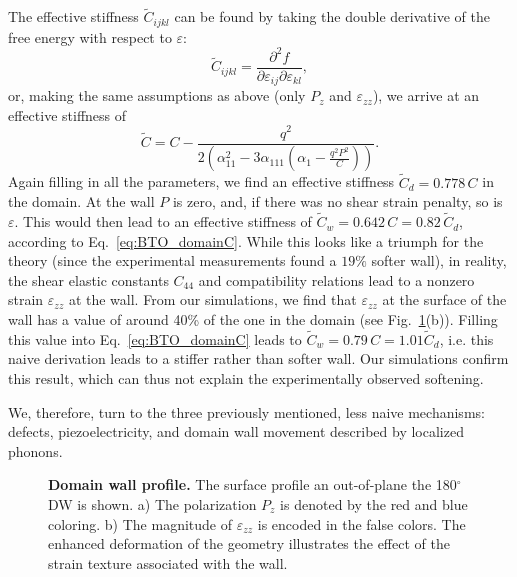 The effective stiffness $\tilde{C}_{ijkl}$ can be found by taking the double derivative of the free energy with respect to $\varepsilon$:
\begin{equation}
	\tilde{C}_{ijkl} = \frac{\partial^2 f}{\partial \varepsilon_{ij} \partial \varepsilon_{kl}},
\end{equation}
or, making the same assumptions as above (only $P_z$ and $\varepsilon_{zz}$), we arrive at an effective stiffness of
\begin{equation}
	\label{eq:BTO_domainC}
	\tilde{C} = C - \frac{q^2}{2\left(\alpha_{11}^2 - 3 \alpha_{111}\left(\alpha_1  - \frac{q^2 P^2}{C}\right)\right)}.
\end{equation}
Again filling in all the parameters, we find an effective stiffness $\tilde{C}_d = 0.778 \,C$ in the domain.
At the wall $P$ is zero, and, if there was no shear strain penalty, so is $\varepsilon$. This would then lead to an effective stiffness of $\tilde{C}_w = 0.642 \, C = 0.82\, \tilde{C}_d$, according to Eq.~\eqref{eq:BTO_domainC}.
While this looks like a triumph for the theory (since the experimental measurements found a $19\%$ softer wall), in reality, the shear elastic constants $C_{44}$ and compatibility relations lead to a nonzero strain $\varepsilon_{zz}$ at the wall.
From our simulations, we find that $\varepsilon_{zz}$ at the surface of the wall has a value of around 40\% of the one in the domain (see Fig.~\ref{fig:BTO_wall}(b)).
Filling this value into Eq.~\eqref{eq:BTO_domainC} leads to $\tilde{C}_w = 0.79 \, C = 1.01 \tilde{C}_d$, i.e. this naive derivation leads to a stiffer rather than softer wall.
Our simulations confirm this result, which can thus not explain the experimentally observed softening.

We, therefore, turn to the three previously mentioned, less naive mechanisms: defects, piezoelectricity, and domain wall movement described by localized phonons.

\begin{figure}[h]
	\caption{\label{fig:BTO_wall} {\bf Domain wall profile.} The surface profile an out-of-plane the 180$^\circ$ DW is shown. a) The polarization $P_z$ is denoted by the red and blue coloring. b) The magnitude of $\varepsilon_{zz}$ is encoded in the false colors. The enhanced deformation of the geometry illustrates the effect of the strain texture associated with the wall.}
\end{figure}

